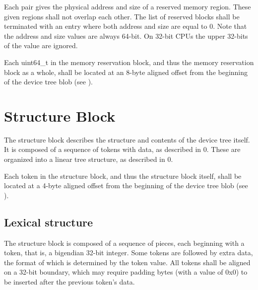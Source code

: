 \documentclass[a4paper,10pt,oneside]{sphinxmanual}
\begin{document}
Each pair gives the physical address and size of a reserved memory
region. These given regions shall not overlap each other. The list of
reserved blocks shall be terminated with an entry where both address and
size are equal to 0. Note that the address and size values are always
64-bit. On 32-bit CPUs the upper 32-bits of the value are ignored.

Each uint64\_t in the memory reservation block, and thus the memory
reservation block as a whole, shall be located at an 8-byte aligned
offset from the beginning of the device tree blob (see
{\hyperref[flattened\string-format:sect\string-fdt\string-alignment]{}}).


\section{Structure Block}
\label{flattened-format:sect-fdt-structure-block}\label{flattened-format:structure-block}
The structure block describes the structure and contents of the device
tree itself. It is composed of a sequence of tokens with data, as
described in 0. These are organized into a linear tree structure, as
described in 0.

Each token in the structure block, and thus the structure block itself,
shall be located at a 4-byte aligned offset from the beginning of the
device tree blob (see {\hyperref[flattened\string-format:sect\string-fdt\string-alignment]{}}).


\subsection{Lexical structure}
\label{flattened-format:lexical-structure}\label{flattened-format:sect-fdt-lexical-structure}
The structure block is composed of a sequence of pieces, each beginning
with a token, that is, a bigendian 32-bit integer. Some tokens are
followed by extra data, the format of which is determined by the token
value. All tokens shall be aligned on a 32-bit boundary, which may
require padding bytes (with a value of 0x0) to be inserted after the
previous token’s data.
\end{document}
